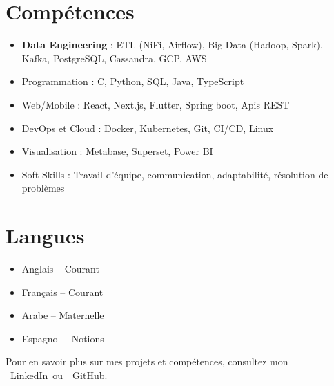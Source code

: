 \documentclass[10pt,a4paper,sans]{moderncv}
\begin{document}
\section{\fontsize{11}{12.1}\selectfont Compétences}
\vspace{-6pt}
\begin{itemize}[leftmargin=0.3cm, itemsep=-2pt, topsep=0pt, partopsep=0pt, parsep=0pt]
    \item \textbf{Data Engineering} : ETL (NiFi, Airflow), Big Data (Hadoop, Spark), Kafka, PostgreSQL, Cassandra, GCP, AWS
    \item Programmation : C, Python, SQL, Java, TypeScript
    \item Web/Mobile : React, Next.js, Flutter, Spring boot, Apis REST
    \item DevOps et Cloud : Docker, Kubernetes, Git, CI/CD, Linux
    \item Visualisation : Metabase, Superset, Power BI
    \item Soft Skills : Travail d’équipe, communication, adaptabilité, résolution de problèmes
\end{itemize}

\vspace{-17pt}
\section{\fontsize{11}{12.1}\selectfont Langues}
\vspace{-16pt}
\begin{multicols}{2}
\begin{itemize}[leftmargin=0.3cm, itemsep=-2pt, topsep=0pt, partopsep=0pt, parsep=0pt]
    \item Anglais – Courant
    \item Français – Courant
    \item Arabe – Maternelle
    \item Espagnol – Notions
\end{itemize}
\end{multicols}


\vspace{-21pt}
\begin{center}
    {\fontsize{9}{11}\selectfont\color{gray}
    Pour en savoir plus sur mes projets et compétences, consultez mon~
    \faLinkedin~\href{https://www.linkedin.com/in/ahmed-makroum/}{LinkedIn}~ou~\faGithub~\href{https://github.com/ahmedmakroum}{GitHub}.}
\end{center}
\end{document}
